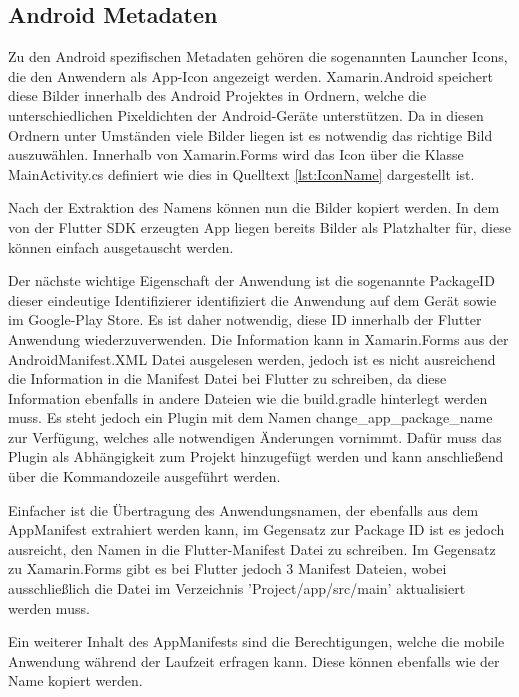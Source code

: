 \subsection{Android Metadaten}
Zu den Android spezifischen Metadaten gehören die sogenannten Launcher Icons,  die den Anwendern als App-Icon angezeigt werden.  Xamarin.Android speichert diese Bilder innerhalb des Android Projektes in Ordnern, welche die unterschiedlichen Pixeldichten der Android-Geräte unterstützen.  Da in diesen Ordnern unter Umständen viele Bilder liegen ist es notwendig das richtige Bild auszuwählen.  Innerhalb von Xamarin.Forms wird das Icon über die Klasse MainActivity.cs definiert wie dies in Quelltext  \ref{lst:IconName} dargestellt ist. 



Nach der Extraktion des Namens können nun die Bilder kopiert werden.  In dem von der Flutter SDK erzeugten App liegen bereits Bilder als Platzhalter für,  diese können einfach ausgetauscht werden. 

Der nächste wichtige Eigenschaft der Anwendung ist die sogenannte PackageID  dieser eindeutige Identifizierer  identifiziert die Anwendung auf dem Gerät sowie im Google-Play Store.  Es ist daher notwendig,  diese ID innerhalb der Flutter Anwendung wiederzuverwenden.  Die Information kann in Xamarin.Forms aus der AndroidManifest.XML Datei ausgelesen werden, jedoch ist es nicht ausreichend die Information in die Manifest Datei bei Flutter zu schreiben, da diese Information ebenfalls in andere Dateien wie die build.gradle hinterlegt werden muss. Es steht jedoch ein Plugin mit dem Namen change\_app\_package\_name zur Verfügung,  welches alle notwendigen Änderungen vornimmt.  Dafür muss das Plugin als Abhängigkeit zum Projekt hinzugefügt werden und kann anschließend über die Kommandozeile ausgeführt werden.

Einfacher ist die Übertragung des Anwendungsnamen,  der ebenfalls aus dem AppManifest extrahiert werden kann, im Gegensatz zur Package ID ist es jedoch ausreicht,  den Namen in die Flutter-Manifest Datei zu schreiben.  Im Gegensatz zu Xamarin.Forms gibt es bei Flutter jedoch 3 Manifest Dateien,  wobei ausschließlich die Datei im Verzeichnis 'Project/app/src/main' aktualisiert werden muss. 

Ein weiterer Inhalt des AppManifests sind die Berechtigungen,  welche die mobile Anwendung während der Laufzeit erfragen kann.  Diese können ebenfalls wie der Name kopiert werden. 

